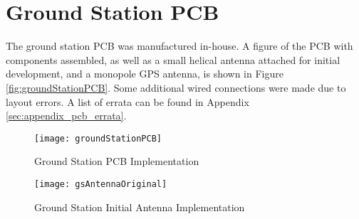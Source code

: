 \graphicspath{{./figures}}

\section{Ground Station PCB}

The ground station PCB was manufactured in-house. A figure of the PCB with components assembled, as well as a small helical antenna attached for initial development, and a monopole GPS antenna, is shown in Figure \ref{fig:groundStationPCB}. Some additional wired connections were made due to layout errors. A list of errata can be found in Appendix \ref{sec:appendix_pcb_errata}.

\begin{figure}[!htb]
  \begin{minipage}{.49\textwidth}
    \centering
    \texttt{[image: groundStationPCB]}
    \caption{Ground Station PCB Implementation}
    \label{fig:groundStationPCB}
  \end{minipage}
  \begin{minipage}{.49\textwidth}
    \centering
    \texttt{[image: gsAntennaOriginal]}
    \caption{Ground Station Initial Antenna Implementation}
    \label{fig:gsAntennaOriginal}
  \end{minipage}
\end{figure}